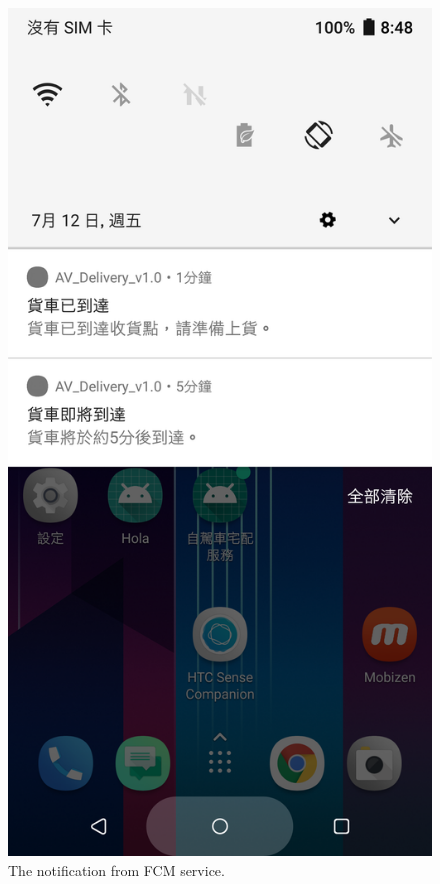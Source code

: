 \documentclass[12pt]{ksthesis}
\begin{document}
\begin{thesis}
{\begin{figure}[H]
\centering
\includegraphics[scale=0.125]{./figures/F4-11-Notification.PNG}
\caption{\large The notification from FCM service.}
\vspace{0.5cm}
\label{Fig:Notification}
\end{figure} 


}
\end{thesis}
\end{document}
